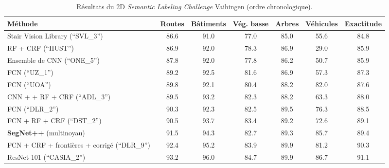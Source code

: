 \begin{table}[tb]
  \centering
  \caption{Résultats du  2D \emph{Semantic Labeling Challenge} Vaihingen (ordre chronologique).}
  \begin{tabularx}{\textwidth}{ Y c c c c c c }
  \toprule
  Méthode & Routes & Bâtiments & Vég. basse & Arbres & Véhicules & Exactitude\\
  \midrule
  Stair Vision Library {\scriptsize (``SVL\_3'')}~\cite{gerke_use_2015} & \num{86,6} &	\num{91,0} &	\num{77,0} &	\num{85,0}	& \num{55,6} &	\num{84,8} \\
  RF + CRF {\scriptsize (``HUST'')}~\cite{quang_efficient_2015} & \num{86,9} & \num{92,0} &	\num{78,3} &	\num{86,9} &	\num{29,0} &	\num{85,9} \\
  Ensemble de CNN {\scriptsize (``ONE\_5'')}~\cite{boulch_dag_2015} & \num{87,8} &	\num{92,0} &	\num{77,8} &	\num{86,2} &	\num{50,7} &	\num{85,9} \\
  FCN {\scriptsize (``UZ\_1'')}~\cite{volpi_dense_2017} & \num{89,2} &	\num{92,5} &	\num{81,6} &	\num{86,9} &	\num{57,3} &	\num{87,3} \\
  FCN {\scriptsize (``UOA'')}~\cite{lin_efficient_2016} & \num{89,8} &	\num{92,1} &	\num{80,4} &	\num{88,2} &	\num{82,0} &	\num{87,6} \\
  CNN +  + RF + CRF {\scriptsize (``ADL\_3'')}~\cite{paisitkriangkrai_effective_2015} & \num{89,5} &	\num{93,2} &	\num{82,3} &	\num{88,2} &	\num{63,3} &	\num{88,0} \\
  FCN {\scriptsize (``DLR\_2'')}~\cite{marmanis_semantic_2016} & \num{90,3} &	\num{92,3} &	\num{82,5} &	\num{89,5} &	\num{76,3} &	\num{88,5} \\
  FCN + RF + CRF {\scriptsize (``DST\_2'')}~\cite{sherrah_fully_2016} & \num{90,5} &	\num{93,7} &	\num{83,4} &	\num{89,2} &	\num{72,6} &	\num{89,1} \\
  \midrule
  \textbf{SegNet++} (multinoyau)~\cite{audebert_semantic_2016} & \num{91,5} &	\num{94,3} &	\num{82,7} &	\num{89,3} &	\num{85,7} &	\num{89,4} \\
	\midrule
	FCN + CRF + frontières +  corrigé {\scriptsize (``DLR\_9'')}~\cite{marmanis_classification_2017} & \num{92.4} & \num{95.2} & \num{83.9} & \num{89.9} & \num{81.2} & \num{90.3}\\
	ResNet-101 {\scriptsize (``CASIA\_2'')}~\cite{liu_semantic_2017} & \num{93.2} &	\num{96.0} & \num{84.7}	& \num{89.9} & \num{86.7} & \num{91.1}\\
  \bottomrule
  \end{tabularx}
  \label{tab:final_vaihingen}
\end{table}

